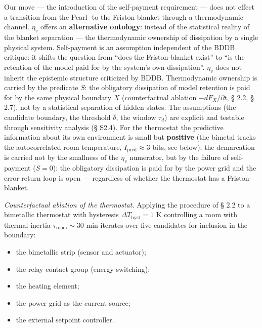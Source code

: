 \documentclass[pdflatex,sn-mathphys-ay]{sn-jnl}
\providecommand{\tightlist}{\setlength{\itemsep}{0pt}\setlength{\parskip}{0pt}}
\begin{document}
Our move --- the introduction of the self-payment requirement --- does not effect a transition from the Pearl- to the Friston-blanket through a thermodynamic channel. \(\eta_v\) offers an \textbf{alternative ontology}: instead of the statistical reality of the blanket separation --- the thermodynamic ownership of dissipation by a single physical system. Self-payment is an assumption independent of the BDDB critique: it shifts the question from ``does the Friston-blanket exist'' to ``is the retention of the model paid for by the system's own dissipation''. \(\eta_v\) does not inherit the epistemic structure criticized by BDDB. Thermodynamic ownership is carried by the predicate \(S\): the obligatory dissipation of model retention is paid for by the same physical boundary \(X\) (counterfactual ablation \(-dF_X/\partial t\), § 2.2, § 2.7), not by a statistical separation of hidden states. The assumptions (the candidate boundary, the threshold \(\delta\), the window \(\tau_d\)) are explicit and testable through sensitivity analysis (§ S2.4). For the thermostat the predictive information about its own environment is small but \textbf{positive} (the bimetal tracks the autocorrelated room temperature, \(I_{\text{pred}} \approx 3\) bits, see below); the demarcation is carried not by the smallness of the \(\eta_v\) numerator, but by the failure of self-payment (\(S = 0\)): the obligatory dissipation is paid for by the power grid and the error-return loop is open --- regardless of whether the thermostat has a Friston-blanket.

\emph{Counterfactual ablation of the thermostat.} Applying the procedure of § 2.2 to a bimetallic thermostat with hysteresis \(\Delta T_{\text{hyst}} = 1\) K controlling a room with thermal inertia \(\tau_{\text{room}} \sim 30\) min iterates over five candidates for inclusion in the boundary:

\begin{itemize}
\tightlist
\item
  the bimetallic strip (sensor and actuator);
\item
  the relay contact group (energy switching);
\item
  the heating element;
\item
  the power grid as the current source;
\item
  the external setpoint controller.
\end{itemize}
\end{document}
